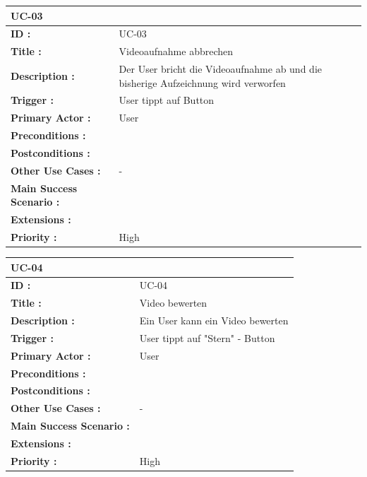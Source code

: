 	\begin{table}[H]
		\begin{tabular}{|p{8cm}|p{8cm}|}
			\hline
			\textbf{UC-03 } \\ 
			\hline
			\textbf{ID :}\centering & UC-03  \\ \hline 
			\textbf{Title :}\centering & Videoaufnahme abbrechen  \\ \hline 
			\textbf{Description :}\centering & Der User bricht die Videoaufnahme ab und die bisherige Aufzeichnung wird verworfen  \\ \hline 
			\textbf{Trigger :}\centering & User tippt auf Button  \\ \hline 
			\textbf{Primary Actor :} \centering & User \\ \hline 
			\textbf{Preconditions :}\centering & 
			\\ \hline 
			\textbf{Postconditions :}\centering & 
			\\ \hline
			\textbf{Other Use Cases :}\centering & - \\ \hline  
			\textbf{Main Success Scenario :}\centering & 
			 \\ \hline  
			\textbf{Extensions :}\centering &  \\ \hline  
			\textbf{Priority :}\centering & High \\ \hline  
		\end{tabular}
	\end{table}
	
	\begin{table}[H]
		\begin{tabular}{|p{8cm}|p{8cm}|}
			\hline
			\textbf{UC-04 } \\ 
			\hline
			\textbf{ID :}\centering & UC-04  \\ \hline 
			\textbf{Title :}\centering & Video bewerten \\ \hline 
			\textbf{Description :}\centering & Ein User kann ein Video bewerten \\ \hline 
			\textbf{Trigger :}\centering & User tippt auf "Stern" - Button  \\ \hline 
			\textbf{Primary Actor :} \centering & User \\ \hline 
			\textbf{Preconditions :}\centering & 
			\\ \hline 
			\textbf{Postconditions :}\centering & 
			\\ \hline
			\textbf{Other Use Cases :}\centering & - \\ \hline  
			\textbf{Main Success Scenario :}\centering & 
			\\ \hline  
			\textbf{Extensions :}\centering & 
			\\ \hline  
			\textbf{Priority :}\centering & High \\ \hline  
		\end{tabular}
	\end{table}
	

